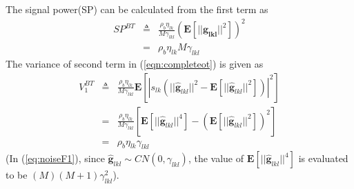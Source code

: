 \documentclass[10pt, a4paper, twoside,fleqn]{article}
\begin{document}
The signal power(SP) can be calculated from the first term as
\begin{eqnarray}
	SP^{BT} &\triangleq&  \frac{\rho_b\eta_{lk}}{M\gamma_{lkl}}(\pmb{E}[||\pmb{\hat g_{lkl}}||^2])^2 \nonumber \\
            &=& \rho_b\eta_{lk}M\gamma_{lkl}
\end{eqnarray}
The variance of second term in (\ref{eqn:completeot}) is given as
\begin{eqnarray}\label{eq:noiseF1}
	V_1^{BT} &\triangleq& \frac{\rho_b \eta_{lk}}{M\gamma_{lkl}}   \pmb{E}[|s_{lk}\left(||\pmb{\hat g}_{lkl}||^2- \pmb{E}[||\pmb{\hat  g}_{lkl}||^2] \right)|^2] \nonumber \\
	    &=& \frac{\rho_b \eta_{lk}}{M\gamma_{lkl}}   \left[\pmb{E}[||\pmb{\hat g}_{lkl}||^4] - (\pmb{E}[||\pmb{\hat g}_{lkl}||^2])^2 \right] \nonumber  \\
	    &=& \rho_b\eta_{lk}\gamma_{lkl}
\end{eqnarray}
(In (\ref{eq:noiseF1}), since $\pmb{\hat g}_{lkl} \sim CN(0,\gamma_{lkl})$, the value of $\pmb{E}[||\pmb{\hat g}_{lkl}||^4]$ is evaluated to be $(M)(M+1)\gamma_{lkl}^2$).
\end{document}

